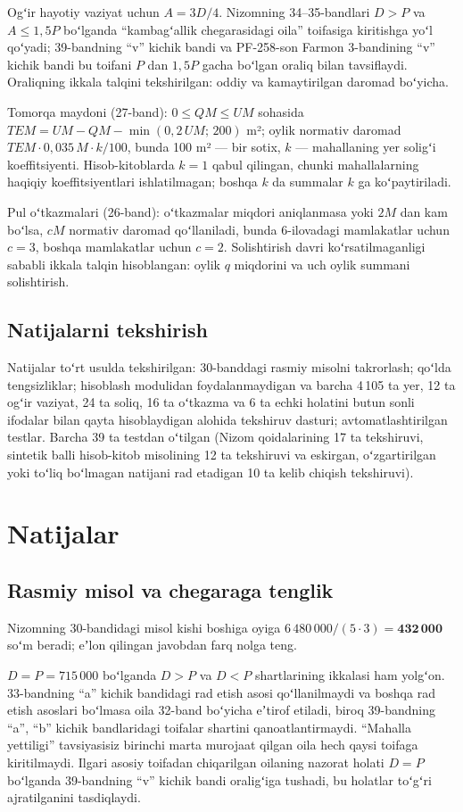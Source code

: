 \documentclass[12pt,a4paper]{extarticle}
\begin{document}
Ogʻir hayotiy vaziyat uchun $A=3D/4$. Nizomning 34–35-bandlari $D>P$ va $A\le1{,}5P$ boʻlganda “kambagʻallik chegarasidagi oila” toifasiga kiritishga yoʻl qoʻyadi; 39-bandning “v” kichik bandi va PF-258-son Farmon 3-bandining “v” kichik bandi bu toifani $P$ dan $1{,}5P$ gacha boʻlgan oraliq bilan tavsiflaydi. Oraliqning ikkala talqini tekshirilgan: oddiy va kamaytirilgan daromad boʻyicha.

Tomorqa maydoni (27-band): $0\le QM\le UM$ sohasida $TEM=UM-QM-\min(0{,}2\,UM;\,200)$ m²; oylik normativ daromad $TEM\cdot0{,}035\,M\cdot k/100$, bunda 100 m² — bir sotix, $k$ — mahallaning yer soligʻi koeffitsiyenti. Hisob-kitoblarda $k=1$ qabul qilingan, chunki mahallalarning haqiqiy koeffitsiyentlari ishlatilmagan; boshqa $k$ da summalar $k$ ga koʻpaytiriladi.

Pul oʻtkazmalari (26-band): oʻtkazmalar miqdori aniqlanmasa yoki $2M$ dan kam boʻlsa, $cM$ normativ daromad qoʻllaniladi, bunda 6-ilovadagi mamlakatlar uchun $c=3$, boshqa mamlakatlar uchun $c=2$. Solishtirish davri koʻrsatilmaganligi sababli ikkala talqin hisoblangan: oylik $q$ miqdorini va uch oylik summani solishtirish.

\subsection{Natijalarni tekshirish}
Natijalar toʻrt usulda tekshirilgan: 30-banddagi rasmiy misolni takrorlash; qoʻlda tengsizliklar; hisoblash modulidan foydalanmaydigan va barcha 4\,105 ta yer, 12 ta ogʻir vaziyat, 24 ta soliq, 16 ta oʻtkazma va 6 ta echki holatini butun sonli ifodalar bilan qayta hisoblaydigan alohida tekshiruv dasturi; avtomatlashtirilgan testlar. Barcha 39 ta testdan oʻtilgan (Nizom qoidalarining 17 ta tekshiruvi, sintetik balli hisob-kitob misolining 12 ta tekshiruvi va eskirgan, oʻzgartirilgan yoki toʻliq boʻlmagan natijani rad etadigan 10 ta kelib chiqish tekshiruvi).

\section{Natijalar}
\subsection{Rasmiy misol va chegaraga tenglik}
Nizomning 30-bandidagi misol kishi boshiga oyiga $6\,480\,000/(5\cdot3)=\mathbf{432\,000}$ soʻm beradi; eʼlon qilingan javobdan farq nolga teng.

$D=P=715\,000$ boʻlganda $D>P$ va $D<P$ shartlarining ikkalasi ham yolgʻon. 33-bandning “a” kichik bandidagi rad etish asosi qoʻllanilmaydi va boshqa rad etish asoslari boʻlmasa oila 32-band boʻyicha eʼtirof etiladi, biroq 39-bandning “a”, “b” kichik bandlaridagi toifalar shartini qanoatlantirmaydi. “Mahalla yettiligi” tavsiyasisiz birinchi marta murojaat qilgan oila hech qaysi toifaga kiritilmaydi. Ilgari asosiy toifadan chiqarilgan oilaning nazorat holati $D=P$ boʻlganda 39-bandning “v” kichik bandi oraligʻiga tushadi, bu holatlar toʻgʻri ajratilganini tasdiqlaydi.
\end{document}
